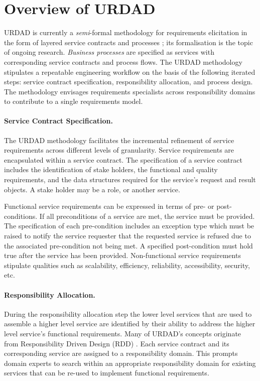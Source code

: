 \section{Overview of URDAD 
\label{sec:urdadMethodology}}

URDAD is currently a \emph{semi}-formal methodology for requirements elicitation in the form of layered service contracts and processes  \cite{solms_urdad_2010}; its formalisation is the topic of ongoing research. \emph{Business processes} are specified as services with corresponding service contracts and process flows. The URDAD methodology stipulates a repeatable engineering workflow on the basis of the following iterated steps: service contract specification, responsibility allocation, and process design. The methodology envisages requirements specialists across responsibility domains to contribute to a single requirements model.

\paragraph{Service Contract Specification.} The URDAD methodology facilitates the incremental refinement of service requirements across different levels of granularity. Service requirements are encapsulated within a service contract. The specification of a service contract includes the identification of stake holders, the functional and quality requirements, and the data structures required for the service's request and result objects. A stake holder may be a role, or another service.

Functional service requirements can be expressed in ter\-ms of pre- or post-conditions. If all preconditions of a service are met, the service must be provided. The specification of each pre-condition includes an exception type which must be raised to notify the service requester that the requested service is refused due to the associated pre-condition not being met. A specified post-condition must hold true after the service has been provided. Non-functio\-nal service requirements stipulate qualities such as scalability, efficiency, reliability, accessibility, security, etc.

\paragraph{Responsibility Allocation.} During the responsibility allocation step the lower level services that are used to assemble a higher level service are identified by their ability to address the higher level service's functional requirements. Many of URDAD's concepts originate from Responsibility Driven Design (RDD) \cite{wirfs-brock_object-oriented_1989,wirfs-brock_object_2002}. Each service contract and its corresponding service are assigned to a responsibility domain. This prompts domain experts to search within an appropriate responsibility domain for existing services that can be re-used to implement functional requirements.

